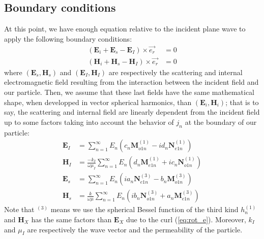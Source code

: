 \documentclass{article}
\numberwithin{equation}{section}
\begin{document}
\subsection{Boundary conditions}

At this point, we have enough equation relative to the incident plane wave to apply the following boundary conditions:
\begin{align}\label{eq:boundaries}
(\textbf{E}_{i} + \textbf{E}_{s} - \textbf{E}_{I}) \times \overrightarrow{e_{r}} &= 0\\
(\textbf{H}_{i} + \textbf{H}_{s} - \textbf{H}_{I}) \times \overrightarrow{e_{r}} &= 0
\end{align}
where $(\textbf{E}_{s}, \textbf{H}_{s})$ and $(\textbf{E}_{I}, \textbf{H}_{I})$ are respectively the scattering and internal electromagnetic field resulting from the interaction between the incident field and our particle. Then, we assume that these last fields have the same mathematical shape, when developped in vector spherical harmonics, than $(\textbf{E}_{i}, \textbf{H}_{i})$; that is to say, the scattering and internal field are linearly dependent from the incident field up to some factors taking into account the behavior of $j_{n}$ at the boundary of our particle:
\begin{align}
\textbf{E}_{I}&=\sum_{n=1}^{\infty }E_{n}(c_{n}\textbf{M}^{(1)}_{o1n} - id_{n}\textbf{N}^{(1)}_{e1n})\\
\textbf{H}_{I}&=\frac{-k_{I}}{\omega\mu_{I}}\sum_{n=1}^{\infty }E_{n}(d_{n}\textbf{M}^{(1)}_{e1n} + ic_{n}\textbf{N}^{(1)}_{o1n})\\
\textbf{E}_{s}&=\sum_{n=1}^{\infty }E_{n}(ia_{n}\textbf{N}^{(3)}_{e1n} - b_{n}\textbf{M}^{(3)}_{o1n})\\
\textbf{H}_{s}&=\frac{k}{\omega\mu}\sum_{n=1}^{\infty }E_{n}(ib_{n}\textbf{N}^{(3)}_{o1n} + a_{n}\textbf{M}^{(3)}_{e1n})
\end{align}
Note that $^{(3)}$ means we use the spherical Bessel function of the third kind $h^{(1)}_{n}$ and $\textbf{H}_{X}$ has the same factors than $\textbf{E}_{X}$ due to the curl (\ref{eq:rot_e}). Moreover, $k_{I}$ and $\mu_{I}$ are respectively the wave vector and the permeability of the particle.
\end{document}
